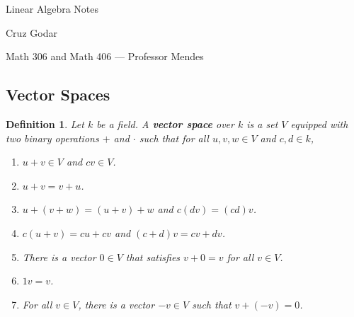 \documentclass{article}
\theoremstyle{colontheorem}
\newtheorem{definition}[theorem]{Definition}
\newenvironment{Def}
{
	\begin{mdframed}[backgroundcolor=DefGreen!10]
	\begin{definition}
}
{
	\end{definition}
	\end{mdframed}
	
	\vspace{.15in}
}
\begin{document}
\vspace*{.5in}

\begin{center}
	\Huge Linear Algebra Notes\\
	
	\vspace{.25in}
	
	\Large Cruz Godar\\
	
	\vspace{.25in}
	
	\normalsize Math 306 and Math 406 --- Professor Mendes
\end{center}

\vspace{.5in}





\begin{center}
	\section{Vector Spaces}
	\vspace{.1in}
\end{center}



\begin{Def}
	
	Let $k$ be a field. A \textbf{vector space} over $k$ is a set $V$ equipped with two binary operations $+$ and $\cdot$ such that for all $u,v,w \in V$ and $c,d \in k$,
	
	\begin{enumerate}
		
		\item $u+v \in V$ and $cv \in V$.
		\item $u+v = v+u$.
		\item $u+(v+w) = (u+v)+w$ and $c(dv) = (cd)v$.
		\item $c(u+v) = cu+cv$ and $(c+d)v = cv+dv$.
		\item There is a vector $0 \in V$ that satisfies $v+0 = v$ for all $v \in V$.
		\item $1v = v$.
		\item For all $v \in V$, there is a vector $-v \in V$ such that $v + (-v) = 0$.
		
	\end{enumerate}
	
\end{Def}
\end{document}
